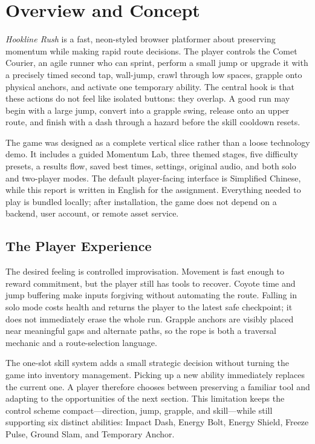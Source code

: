 \documentclass[11pt,letterpaper]{article}
\newcommand{\projectname}{\textit{Hookline Rush}}
\begin{document}
\section{Overview and Concept}

\projectname{} is a fast, neon-styled browser platformer about preserving momentum while making rapid route decisions. The player controls the Comet Courier, an agile runner who can sprint, perform a small jump or upgrade it with a precisely timed second tap, wall-jump, crawl through low spaces, grapple onto physical anchors, and activate one temporary ability. The central hook is that these actions do not feel like isolated buttons: they overlap. A good run may begin with a large jump, convert into a grapple swing, release onto an upper route, and finish with a dash through a hazard before the skill cooldown resets.

The game was designed as a complete vertical slice rather than a loose technology demo. It includes a guided Momentum Lab, three themed stages, five difficulty presets, a results flow, saved best times, settings, original audio, and both solo and two-player modes. The default player-facing interface is Simplified Chinese, while this report is written in English for the assignment. Everything needed to play is bundled locally; after installation, the game does not depend on a backend, user account, or remote asset service.

\subsection{The Player Experience}

The desired feeling is controlled improvisation. Movement is fast enough to reward commitment, but the player still has tools to recover. Coyote time and jump buffering make inputs forgiving without automating the route. Falling in solo mode costs health and returns the player to the latest safe checkpoint; it does not immediately erase the whole run. Grapple anchors are visibly placed near meaningful gaps and alternate paths, so the rope is both a traversal mechanic and a route-selection language.

The one-slot skill system adds a small strategic decision without turning the game into inventory management. Picking up a new ability immediately replaces the current one. A player therefore chooses between preserving a familiar tool and adapting to the opportunities of the next section. This limitation keeps the control scheme compact---direction, jump, grapple, and skill---while still supporting six distinct abilities: Impact Dash, Energy Bolt, Energy Shield, Freeze Pulse, Ground Slam, and Temporary Anchor.
\end{document}
